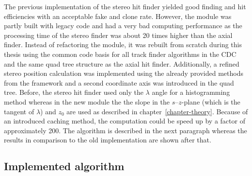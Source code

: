 The previous implementation of the stereo hit finder yielded good finding and hit efficiencies with an acceptable fake and clone rate. However, the module was partly built with legacy code and had a very bad computing performance as the processing time of the stereo finder was about 20 times higher than the axial finder. Instead of refactoring the module, it was rebuilt from scratch during this thesis using the common code basis for all track finder algorithms in the CDC and the same quad tree structure as the axial hit finder. Additionally, a refined stereo position calculation was implemented using the already provided methods from the framework and a second coordinate axis was introduced in the quad tree. Before, the stereo hit finder used only the $\lambda$ angle for a histogramming method whereas in the new module the the slope in the $s$--$z$-plane (which is the tangent of $\lambda$) and $z_0$ are used as described in chapter~\ref{chapter-theory}. Because of an introduced caching method, the computation could be speed up by a factor of approximately 200. The algorithm is described in the next paragraph whereas the results in comparison to the old implementation are shown after that.

\subsection{Implemented algorithm}

